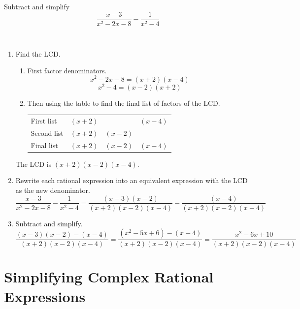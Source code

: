 \documentclass[
  en,11pt]{elegantbook}
\let\BeginKnitrBlock\begin \let\EndKnitrBlock\end
\begin{document}
\BeginKnitrBlock{example}
\protect\hypertarget{exm:unnamed-chunk-49}{}{\label{exm:unnamed-chunk-49} }
Subtract and simplify\\
\[\dfrac{x-3}{x^2-2x-8}- \dfrac{1}{x^2-4}\]
\EndKnitrBlock{example}

\BeginKnitrBlock{solution}
{}\\

\begin{enumerate}
\def\labelenumi{\arabic{enumi}.}

\item
  Find the LCD.

  \begin{enumerate}
  \def\labelenumii{\arabic{enumii}.}
  \item
    First factor denominators.\\
    \[x^2-2x-8=(x+2)(x-4)\]
    \[x^2-4=(x-2)(x+2)\]
  \item
    Then using the table to find the final list of factors of the LCD.

    \begin{longtable}[]{@{}lccc@{}}
    \toprule
    \endhead
    First list & \((x+2)\) & & \((x-4)\)\tabularnewline
    Second list & \((x+2)\) & \((x-2)\) &\tabularnewline
    Final list & \((x+2)\) & \((x-2)\) & \((x-4)\)\tabularnewline
    \bottomrule
    \end{longtable}
  \end{enumerate}

  The LCD is \((x+2)(x-2)(x-4)\).
\item
  Rewrite each rational expression into an equivalent expression with the LCD as the new denominator.\\
  \[
       \dfrac{x-3}{x^2-2x-8}- \dfrac{1}{x^2-4}=\dfrac{(x-3)(x-2)}{(x+2)(x-2)(x-4)}-\dfrac{(x-4)}{(x+2)(x-2)(x-4)}
   \]
\item
  Subtract and simplify.\\
  \[
       \dfrac{(x-3)(x-2)-(x-4)}{(x+2)(x-2)(x-4)}=\dfrac{(x^2-5x+6)-(x-4)}{(x+2)(x-2)(x-4)}=\dfrac{x^2-6x+10}{(x+2)(x-2)(x-4)}
   \]
\end{enumerate}
\EndKnitrBlock{solution}

\hypertarget{simplifying-complex-rational-expressions}{%
\section{Simplifying Complex Rational Expressions}\label{simplifying-complex-rational-expressions}}
\end{document}
